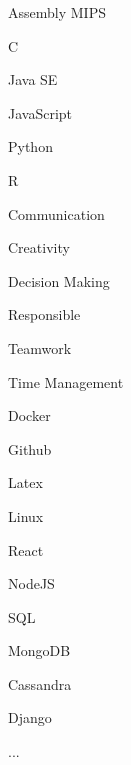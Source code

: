 \begin{cventries}
    \cventry
        {}
        {}
        {}
        {}
        {
            \begin{cvitems}
                \item Assembly MIPS
                \item C
                \item Java SE
                \item JavaScript
                \item Python
                \item R
            \end{cvitems}
        }
\end{cventries}
\begin{cventries}
    \cventry
        {}
        {}
        {}
        {}
        {
            \begin{cvitems}
                \item Communication
                \item Creativity
                \item Decision Making
                \item Responsible
                \item Teamwork
                \item Time Management
            \end{cvitems}
        }
\end{cventries}
\begin{cventries}
    \cventry
        {}
        {}
        {}
        {}
        {
            \begin{cvitems}
                \item Docker
                \item Github
                \item Latex
                \item Linux
                \item React
                \item NodeJS
                \item SQL
                \item MongoDB
                \item Cassandra
                \item Django
                \item ...
            \end{cvitems}
        }
\end{cventries}
